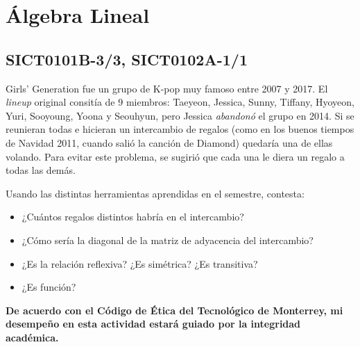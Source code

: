 \documentclass{article}
\begin{document}
\section{Álgebra Lineal}

\subsection{SICT0101B-3/3, SICT0102A-1/1}

Girls' Generation fue un grupo de K-pop muy famoso entre 2007 y 2017.
El \textit{lineup} original consitía de 9 miembros: Taeyeon, Jessica, Sunny, Tiffany, Hyoyeon, Yuri, Sooyoung, Yoona y Seouhyun, pero Jessica \textit{abandonó} el grupo en 2014.
Si se reunieran todas e hicieran un intercambio de regalos (como en los buenos tiempos de Navidad 2011, cuando salió la canción de Diamond) quedaría una de ellas volando. Para evitar este problema, se sugirió que cada una le diera un regalo a todas las demás.

Usando las distintas herramientas aprendidas en el semestre, contesta:

\begin{itemize}
    \item ¿Cuántos regalos distintos habría en el intercambio?
    \item ¿Cómo sería la diagonal de la matriz de adyacencia del intercambio?
    \item ¿Es la relación reflexiva? ¿Es simétrica? ¿Es transitiva?
    \item ¿Es función?
\end{itemize}


\vfill

\textbf{De acuerdo con el Código de Ética del Tecnológico de Monterrey, mi desempeño en esta actividad estará guiado por la integridad académica.}
\end{document}
